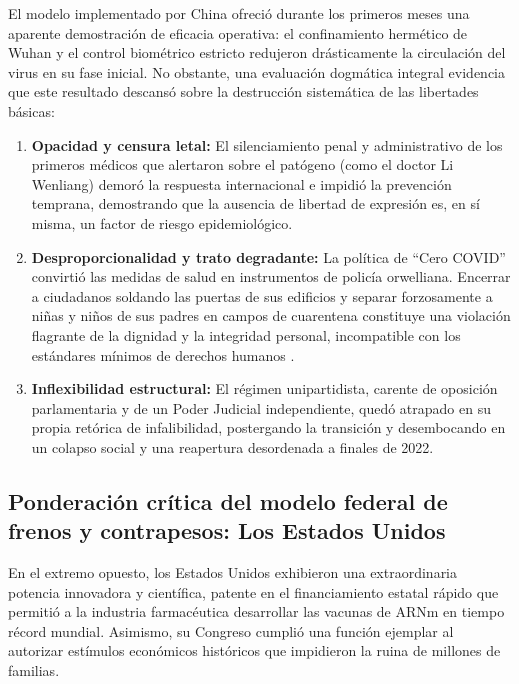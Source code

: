 \documentclass[12pt,spanish,letterpaper,oneside]{article}
\begin{document}
El modelo implementado por China ofreci\'o durante los primeros meses una aparente demostraci\'on de eficacia operativa: el confinamiento herm\'etico de Wuhan y el control biom\'etrico estricto redujeron dr\'asticamente la circulaci\'on del virus en su fase inicial. No obstante, una evaluaci\'on dogm\'atica integral evidencia que este resultado descans\'o sobre la destrucci\'on sistem\'atica de las libertades b\'asicas:
\begin{enumerate}
  \item \textbf{Opacidad y censura letal:} El silenciamiento penal y administrativo de los primeros m\'edicos que alertaron sobre el pat\'ogeno (como el doctor Li Wenliang) demor\'o la respuesta internacional e impidi\'o la prevenci\'on temprana, demostrando que la ausencia de libertad de expresi\'on es, en s\'i misma, un factor de riesgo epidemiol\'ogico.
  \item \textbf{Desproporcionalidad y trato degradante:} La pol\'itica de ``Cero COVID'' convirti\'o las medidas de salud en instrumentos de polic\'ia orwelliana. Encerrar a ciudadanos soldando las puertas de sus edificios y separar forzosamente a ni\~nas y ni\~nos de sus padres en campos de cuarentena constituye una violaci\'on flagrante de la dignidad y la integridad personal, incompatible con los est\'andares m\'inimos de derechos humanos \citep{scjnDignidad2016}.
  \item \textbf{Inflexibilidad estructural:} El r\'egimen unipartidista, carente de oposici\'on parlamentaria y de un Poder Judicial independiente, qued\'o atrapado en su propia ret\'orica de infalibilidad, postergando la transici\'on y desembocando en un colapso social y una reapertura desordenada a finales de 2022.
\end{enumerate}

\subsection{Ponderaci\'on cr\'itica del modelo federal de frenos y contrapesos: Los Estados Unidos}

En el extremo opuesto, los Estados Unidos exhibieron una extraordinaria potencia innovadora y cient\'ifica, patente en el financiamiento estatal r\'apido que permiti\'o a la industria farmac\'eutica desarrollar las vacunas de ARNm en tiempo r\'ecord mundial. Asimismo, su Congreso cumpli\'o una funci\'on ejemplar al autorizar est\'imulos econ\'omicos hist\'oricos que impidieron la ruina de millones de familias. 
\end{document}
